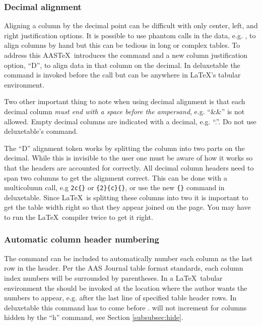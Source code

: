 \documentclass[linenumbers]{aastex631}
\newcommand\aastex{AAS\TeX}
\newcommand\latex{La\TeX}
\begin{document}
\subsubsection{Decimal alignment}

Aligning a column by the decimal point can be difficult with only center,
left, and right justification options.  It is possible to use phantom calls
in the data, e.g. {\tt\string\phn}, to align columns by hand but this can
be tedious in long or complex tables.  To address this \aastex\ introduces
the {\tt\string\decimals} command and a new column justification option,
``D'', to align data in that column on the decimal.  In deluxetable the
{\tt\string\decimals} command is invoked before the {\tt\string\startdata}
call but can be anywhere in \latex's tabular environment.  

Two other important thing to note when using decimal alignment is that each
decimal column \textit{must end with a space before the ampersand}, e.g.
``\&\&'' is not allowed.  Empty decimal columns are indicated with a decimal,
e.g. ``.''.  Do not use deluxetable's {\tt\string\nodata} command.

The ``D'' alignment token works by splitting the column into two parts on the
decimal.  While this is invisible to the user one must be aware of how it
works so that the headers are accounted for correctly.  All decimal column
headers need to span two columns to get the alignment correct. This can be
done with a multicolumn call, e.g {\tt\string\multicolumn2c\{\}} or
{\tt\string\multicolumn\{2\}\{c\}\{\}}, or use the new
{\tt\string\twocolhead\{\}} command in deluxetable.  Since \latex\ is
splitting these columns into two it is important to get the table width
right so that they appear joined on the page.  You may have to run the
\latex\ compiler twice to get it right.  

\subsubsection{Automatic column header numbering} \label{subsubsec:autonumber}

The command {\tt\string\colnumbers} can be included to automatically number
each column as the last row in the header. Per the AAS Journal table format
standards, each column index numbers will be surrounded by parentheses. In
a \latex\ tabular environment the {\tt\string\colnumbers} should be invoked
at the location where the author wants the numbers to appear, e.g. after
the last line of specified table header rows. In deluxetable this command
has to come before {\tt\string\startdata}.  {\tt\string\colnumbers} will
not increment for columns hidden by the ``h'' command, see Section
\ref{subsubsec:hide}. 
\end{document}
